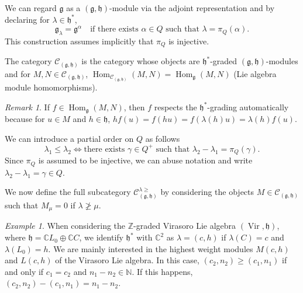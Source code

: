 \documentclass[a4paper, 12pt, reqno]{amsart}
\theoremstyle{remark}
\newtheorem{remark}[theorem]{Remark}
\newtheorem{example}[theorem]{Example}
\DeclareMathOperator{\Vir}{Vir}
\DeclareMathOperator{\Hom}{Hom}
\begin{document}
We can regard $\mathfrak{g}$ as a $(\mathfrak{g}, \mathfrak{h})$-module via the adjoint representation and by declaring for $\lambda \in \mathfrak{h}^*$,
\begin{equation*}
  \mathfrak{g}_{\lambda} = \mathfrak{g}^{\alpha} \quad \text{if there exists $\alpha \in Q$ such that $\lambda = \pi_Q(\alpha)$}.
\end{equation*}
This construction assumes implicitly that $\pi_Q$ is injective.

The category $\mathcal{C}_{(\mathfrak{g}, \mathfrak{h})}$ is the category whose objects are $\mathfrak{h}^*$-graded $(\mathfrak{g}, \mathfrak{h})$-modules and for $M, N \in \mathcal{C}_{(\mathfrak{g}, \mathfrak{h})}$, $\Hom_{\mathcal{C}_{(\mathfrak{g}, \mathfrak{h})}}(M, N) = \Hom_{\mathfrak{g}}(M, N)$ (Lie algebra module homomorphisms).

\begin{remark}
  \label{rmk:1}
  If $f \in \Hom_{\mathfrak{g}}(M, N)$, then $f$ respects the $\mathfrak{h}^*$-grading automatically because for $u \in M$ and $h \in \mathfrak{h}$, $hf(u) = f(hu) = f(\lambda(h)u) = \lambda(h)f(u)$.
\end{remark}

We can introduce a partial order on $Q$ as follows
\begin{equation*}
  \lambda_1 \le \lambda_2 \iff \text{there exists $\gamma \in Q^+$ such that $\lambda_2 - \lambda_1 = \pi_Q(\gamma)$.}
\end{equation*}
Since $\pi_Q$ is assumed to be injective, we can abuse notation and write $\lambda_2 - \lambda_1 = \gamma \in Q$.

We now define the full subcategory $\mathcal{C}^{\lambda \ge}_{(\mathfrak{g}, \mathfrak{h})}$ by considering the objects $M \in \mathcal{C}_{(\mathfrak{g}, \mathfrak{h})}$ such that $M_{\mu} = 0$ if $\lambda \ngeq \mu$.

\begin{example}
  \label{exa:3}
  When considering the $\mathbb{Z}$-graded Virasoro Lie algebra $(\Vir, \mathfrak{h})$, where $\mathfrak{h} = \mathbb{C}L_0 \oplus \mathbb{C}C$, we identify $\mathfrak{h}^*$ with $\mathbb{C}^2$ as $\lambda = (c, h)$ if $\lambda(C) = c$ and $\lambda(L_0) = h$.
  We are mainly interested in the highest weight modules $M(c, h)$ and $L(c, h)$ of the Virasoro Lie algebra.
  In this case, $(c_2, n_2) \ge (c_1, n_1)$ if and only if $c_1 = c_2$ and $n_1 - n_2 \in \mathbb{N}$.
  If this happens, $(c_2, n_2) - (c_1, n_1) = n_1 - n_2$.
\end{example}
\end{document}
